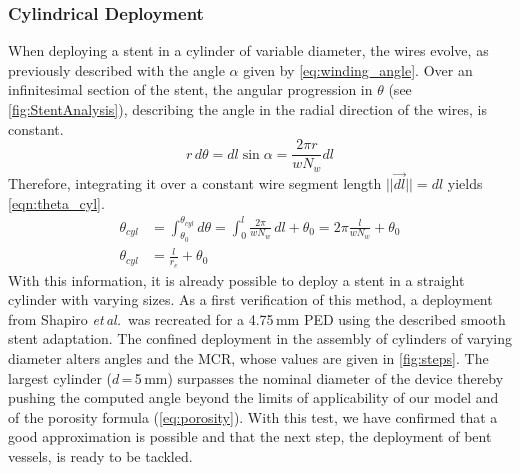 \subsubsection*{Cylindrical Deployment}
When deploying a stent in a cylinder of variable diameter, the wires evolve, as previously described with the angle $\alpha$ given by \autoref{eq:winding_angle}. Over an infinitesimal section of the stent, the angular progression in $\theta$ (see \autoref{fig:StentAnalysis}), describing the angle in the radial direction of the wires, is constant.
\begin{equation*}
	r\,d\theta = dl\sin{\alpha} = \frac{2\pi r}{wN_w}dl
\end{equation*}
Therefore, integrating it over a constant wire segment length $||\vec{dl}||=dl$ yields \autoref{eqn:theta_cyl}.
\begin{equation}
	\begin{split}
		\theta_{cyl} &= \int_{\theta_0}^{\theta_{cyl}}d\theta = \int_0^l \frac{2\pi}{wN_w}\,dl + \theta_0 = 2\pi \frac{l}{wN_w} + \theta_0\\
		\theta_{cyl} &= \frac{l}{r_e}+ \theta_0
	\end{split}
	\label{eqn:theta_cyl}
\end{equation}
With this information, it is already possible to deploy a stent in a straight cylinder with varying sizes. As a first verification of this method, a deployment from Shapiro \textit{et\,al.}\,\cite{Shapiro2014a} was recreated for a 4.75\,mm PED using the described smooth stent adaptation. The confined deployment in the assembly of cylinders of varying diameter alters angles and the MCR, whose values are given in \autoref{fig:steps}. The largest cylinder ($d$\,=\,5\,mm) surpasses the nominal diameter of the device thereby pushing the computed angle beyond the limits of applicability of our model and of the porosity formula (\autoref{eq:porosity}). With this test, we have confirmed that a good approximation is possible and that the next step, the deployment of bent vessels, is ready to be tackled.
